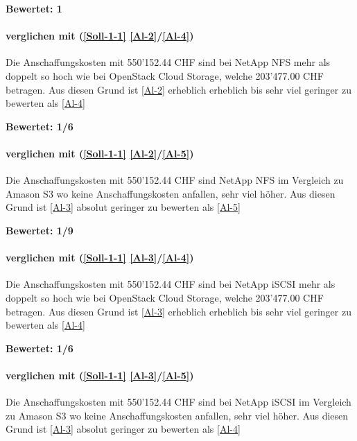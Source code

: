 \textbf{Bewertet: 1}

\paragraph*{  verglichen mit  (\ref{Soll-1-1} \ref{Al-2}/\ref{Al-4})}
Die Anschaffungskosten mit 550’152.44 CHF sind bei NetApp NFS mehr als doppelt so hoch wie bei OpenStack Cloud Storage, welche 203'477.00 CHF betragen. Aus diesen Grund ist  \ref{Al-2} erheblich erheblich bis sehr viel geringer zu bewerten als  \ref{Al-4}

\textbf{Bewertet: 1/6}

\paragraph*{  verglichen mit  (\ref{Soll-1-1} \ref{Al-2}/\ref{Al-5})}

Die Anschaffungskosten mit 550’152.44 CHF sind NetApp NFS im Vergleich zu Amason S3 wo keine Anschaffungskosten anfallen, sehr viel höher. Aus diesen Grund ist  \ref{Al-3} absolut geringer zu bewerten als  \ref{Al-5}

\textbf{Bewertet: 1/9}


\paragraph*{  verglichen mit  (\ref{Soll-1-1} \ref{Al-3}/\ref{Al-4})}

Die Anschaffungskosten mit 550’152.44 CHF sind bei NetApp iSCSI mehr als doppelt so hoch wie bei OpenStack Cloud Storage, welche 203'477.00 CHF betragen. Aus diesen Grund ist  \ref{Al-3} erheblich erheblich bis sehr viel geringer zu bewerten als  \ref{Al-4}

\textbf{Bewertet: 1/6}

\paragraph*{  verglichen mit  (\ref{Soll-1-1} \ref{Al-3}/\ref{Al-5})}
Die Anschaffungskosten mit 550’152.44 CHF sind bei NetApp iSCSI im Vergleich zu Amason S3 wo keine Anschaffungskosten anfallen, sehr viel höher. Aus diesen Grund ist  \ref{Al-3} absolut geringer zu bewerten als  \ref{Al-4}

